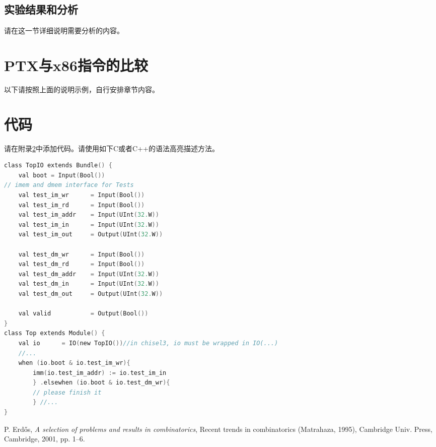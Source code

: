 \documentclass[a4paper]{article}
\begin{document}
\subsection{实验结果和分析}\label{sub:ptxeva}
请在这一节详细说明需要分析的内容。
\section{PTX与x86指令的比较}\label{ptxvsx86}
以下请按照上面的说明示例，自行安排章节内容。

\appendix
\section{代码}\label{sub:app.code}
请在附录\ref{sub:app.code}中添加代码。请使用如下C或者C++的语法高亮描述方法。
\begin{lstlisting}[language=C]
class TopIO extends Bundle() {
	val boot = Input(Bool()) 
// imem and dmem interface for Tests
	val test_im_wr		= Input(Bool())
	val test_im_rd 		= Input(Bool())
	val test_im_addr 	= Input(UInt(32.W))
	val test_im_in 		= Input(UInt(32.W))
	val test_im_out 	= Output(UInt(32.W))

	val test_dm_wr		= Input(Bool())
	val test_dm_rd 		= Input(Bool())
	val test_dm_addr 	= Input(UInt(32.W))
	val test_dm_in 		= Input(UInt(32.W))
	val test_dm_out 	= Output(UInt(32.W))

	val valid			= Output(Bool())
}
class Top extends Module() {
	val io 		= IO(new TopIO())//in chisel3, io must be wrapped in IO(...) 
	//...
	when (io.boot & io.test_im_wr){
		imm(io.test_im_addr) := io.test_im_in
		} .elsewhen (io.boot & io.test_dm_wr){
		// please finish it
		} //...
}
\end{lstlisting}
\newpage
\begin{thebibliography}{9}
 P. Erd\H os, \emph{A selection of problems and
results in combinatorics}, Recent trends in combinatorics (Matrahaza,
1995), Cambridge Univ. Press, Cambridge, 2001, pp. 1--6.
\end{thebibliography}
\end{document}
